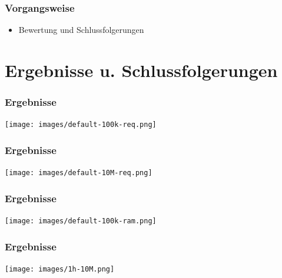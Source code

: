 \documentclass{beamer}
\begin{document}
\begin{frame}
    \frametitle{Vorgangsweise}
    \begin{itemize}
        \item Bewertung und Schlussfolgerungen
    \end{itemize}
\end{frame}

%
%


\section{Ergebnisse u. Schlussfolgerungen}

\begin{frame}
    \frametitle{Ergebnisse}
    \texttt{[image: images/default-100k-req.png]}
\end{frame}

\begin{frame}
    \frametitle{Ergebnisse}
    \texttt{[image: images/default-10M-req.png]}
\end{frame}

\begin{frame}
    \frametitle{Ergebnisse}
    \texttt{[image: images/default-100k-ram.png]}
\end{frame}

\begin{frame}
    \frametitle{Ergebnisse}
    \texttt{[image: images/1h-10M.png]}
\end{frame}
\end{document}
